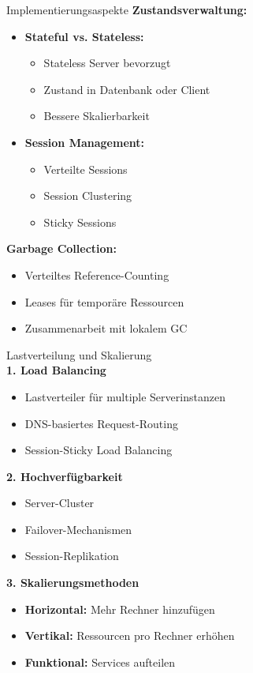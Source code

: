 \begin{example2}{Implementierungsaspekte}
\textbf{Zustandsverwaltung:}
\begin{itemize}
    \item \textbf{Stateful vs. Stateless:}
    \begin{itemize}
        \item Stateless Server bevorzugt
        \item Zustand in Datenbank oder Client
        \item Bessere Skalierbarkeit
    \end{itemize}
    
    \item \textbf{Session Management:}
    \begin{itemize}
        \item Verteilte Sessions
        \item Session Clustering
        \item Sticky Sessions
    \end{itemize}
\end{itemize}

\textbf{Garbage Collection:}
\begin{itemize}
    \item Verteiltes Reference-Counting
    \item Leases für temporäre Ressourcen
    \item Zusammenarbeit mit lokalem GC
\end{itemize}
\end{example2}

\begin{KR}{Lastverteilung und Skalierung}\\
\textbf{1. Load Balancing}
\begin{itemize}
    \item Lastverteiler für multiple Serverinstanzen
    \item DNS-basiertes Request-Routing
    \item Session-Sticky Load Balancing
\end{itemize}

\textbf{2. Hochverfügbarkeit}
\begin{itemize}
    \item Server-Cluster
    \item Failover-Mechanismen
    \item Session-Replikation
\end{itemize}

\textbf{3. Skalierungsmethoden}
\begin{itemize}
    \item \textbf{Horizontal:} Mehr Rechner hinzufügen
    \item \textbf{Vertikal:} Ressourcen pro Rechner erhöhen
    \item \textbf{Funktional:} Services aufteilen
\end{itemize}
\end{KR}






